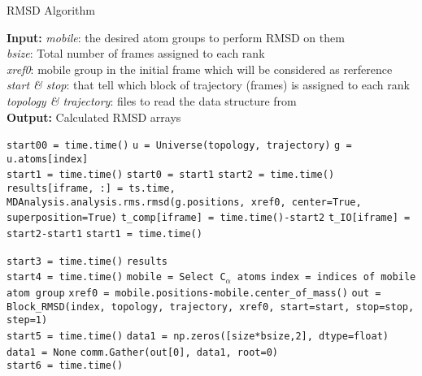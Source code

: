 \begin{algorithm}[t]
	\scriptsize
    \caption{RMSD Algorithm}
    \label{alg:RMSD}
    \hspace*{\algorithmicindent} \textbf{Input:} \emph{mobile}: the desired atom groups to perform RMSD on them \\ 
    \hspace*{\algorithmicindent} \emph{bsize}: Total number of frames assigned to each rank \\
    \hspace*{\algorithmicindent} \emph{xref0}: mobile group in the initial frame which will be considered as rerference \\
    \hspace*{\algorithmicindent} \emph{start \& stop}: that tell which block of trajectory (frames) is assigned to each rank \\
    \hspace*{\algorithmicindent} \emph{topology \& trajectory}: files to read the data structure from \\
    \hspace*{\algorithmicindent} \textbf{Output:} Calculated RMSD arrays
    \begin{algorithmic}[1]
        \State \texttt{start00 = time.time()}
        \State \texttt{u = Universe(topology, trajectory)}
        \State \texttt{g = u.atoms[index]}
        \\
        \State \texttt{start1 = time.time()}
        \State \texttt{start0 = start1}
        \State \texttt{start2 = time.time()}
        \State \texttt{results[iframe, :] = ts.time, MDAnalysis.analysis.rms.rmsd(g.positions, xref0, center=True, superposition=True)}
        \State \texttt{t\_comp[iframe] = time.time()-start2}
        \State \texttt{t\_IO[iframe] = start2-start1}
        \State \texttt{start1 = time.time()}
        \EndFor
        
        \State \texttt{start3 = time.time()}
        \State \Return \texttt{results}
        \EndProcedure
        \\        
        \State \texttt{start4 = time.time()}
        \State \texttt{mobile =  Select C$_{\alpha}$ atoms}
        \State \texttt{index = indices of mobile atom group}
        \State \texttt{xref0 = mobile.positions-mobile.center\_of\_mass()}
	\State \texttt{out = Block\_RMSD(index, topology, trajectory, xref0, start=start, stop=stop, step=1)}
	\\
	\State \texttt{start5 = time.time()}
   	     \State \texttt{data1 = np.zeros([size*bsize,2], dtype=float)}
	\Else
   	     \State \texttt{data1 = None}
              \State \texttt{comm.Gather(out[0], data1, root=0)}
        \EndIf
         \\
         \State \texttt{start6 = time.time()}
    \end{algorithmic}
\end{algorithm}


